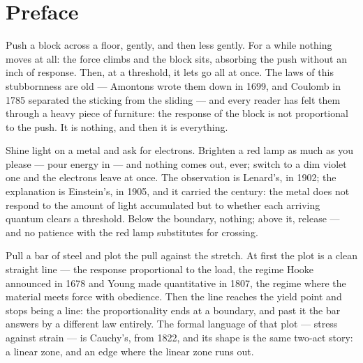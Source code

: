 \chapter*{Preface}

Push a block across a floor, gently, and then less gently. For a while
nothing moves at all: the force climbs and the block sits, absorbing the
push without an inch of response. Then, at a threshold, it lets go all at
once. The laws of this stubbornness are old --- Amontons wrote them down in
1699, and Coulomb in 1785 separated the sticking from the sliding --- and
every reader has felt them through a heavy piece of furniture: the response
of the block is not proportional to the push. It is nothing, and then it is
everything.

Shine light on a metal and ask for electrons. Brighten a red lamp as much as
you please --- pour energy in --- and nothing comes out, ever; switch to a
dim violet one and the electrons leave at once. The observation is Lenard's,
in 1902; the explanation is Einstein's, in 1905, and it carried the century:
the metal does not respond to the amount of light accumulated but to whether
each arriving quantum clears a threshold. Below the boundary, nothing; above
it, release --- and no patience with the red lamp substitutes for crossing.

Pull a bar of steel and plot the pull against the stretch. At first the plot
is a clean straight line --- the response proportional to the load, the
regime Hooke announced in 1678 and Young made quantitative in 1807, the
regime where the material meets force with obedience. Then the line reaches
the yield point and stops being a line: the proportionality ends at a
boundary, and past it the bar answers by a different law entirely. The
formal language of that plot --- stress against strain --- is Cauchy's, from
1822, and its shape is the same two-act story: a linear zone, and an edge
where the linear zone runs out.

